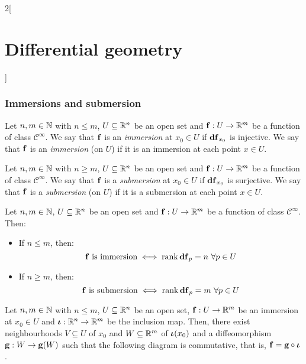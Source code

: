 \documentclass[../../../main_math.tex]{subfiles}
\begin{document}
\begin{multicols}{2}[\section{Differential geometry}]
  \subsubsection{Immersions and submersion}
  \begin{definition}[Immersion]
    Let $n,m\in\mathbb{N}$ with $n\leq m$, $U\subseteq\mathbb{R}^n$ be an open set and $\boldsymbol{\mathrm{f}}:U\rightarrow \mathbb{R}^m$ be a function of class $\mathcal{C}^\infty$. We say that $\boldsymbol{\mathrm{f}}$ is an \emph{immersion} at $x_0\in U$ if $\boldsymbol{\mathrm{\dd{f}}}_{x_0}$ is injective. We say that $\boldsymbol{\mathrm{f}}$ is an \emph{immersion} (on $U$) if it is an immersion at each point $x\in U$.
  \end{definition}
  \begin{definition}[Submersion]
    Let $n,m\in\mathbb{N}$ with $n\geq m$, $U\subseteq\mathbb{R}^n$ be an open set and $\boldsymbol{\mathrm{f}}:U\rightarrow \mathbb{R}^m$ be a function of class $\mathcal{C}^\infty$. We say that $\boldsymbol{\mathrm{f}}$ is a \emph{submersion} at $x_0\in U$ if $\boldsymbol{\mathrm{\dd{f}}}_{x_0}$ is surjective. We say that $\boldsymbol{\mathrm{f}}$ is a \emph{submersion} (on $U$) if it is a submersion at each point $x\in U$.
  \end{definition}
  \begin{proposition}
    Let $n,m\in\mathbb{N}$, $U\subseteq\mathbb{R}^n$ be an open set and $\boldsymbol{\mathrm{f}}:U\rightarrow \mathbb{R}^m$ be a function of class $\mathcal{C}^\infty$. Then:
    \begin{itemize}
      \item If $n\leq m$, then: $$\boldsymbol{\mathrm{f}}\text{ is immersion}\iff\rank\boldsymbol{\mathrm{df}}_p=n\ \forall p\in U$$
      \item If $n\geq m$, then: $$\boldsymbol{\mathrm{f}}\text{ is submersion}\iff\rank\boldsymbol{\mathrm{df}}_p=m\ \forall p\in U$$
    \end{itemize}
  \end{proposition}
  \begin{theorem}
    Let $n,m\in\mathbb{N}$ with $n\leq m$, $U\subseteq\mathbb{R}^n$ be an open set, $\boldsymbol{\mathrm{f}}:U\rightarrow \mathbb{R}^m$ be an immersion at $x_0\in U$ and $\boldsymbol{\mathrm{\iota}}:\mathbb{R}^n\rightarrow\mathbb{R}^m$ be the inclusion map. Then, there exist neighbourhoods $V\subseteq U$ of $x_0$ and $W\subseteq\mathbb{R}^m$ of $\boldsymbol{\mathrm{\iota}}(x_0)$ and a diffeomorphism $\boldsymbol{\mathrm{g}}:W\rightarrow \boldsymbol{\mathrm{g}}(W)$ such that the following diagram is commutative, that is, $\boldsymbol{\mathrm{f}}=\boldsymbol{\mathrm{g}}\circ\boldsymbol{\mathrm{\iota}}$.
    \begin{center}
      \begin{minipage}{\linewidth}
        \centering
        
      \end{minipage}

\end{center}
\end{theorem}
\end{multicols}
\end{document}

